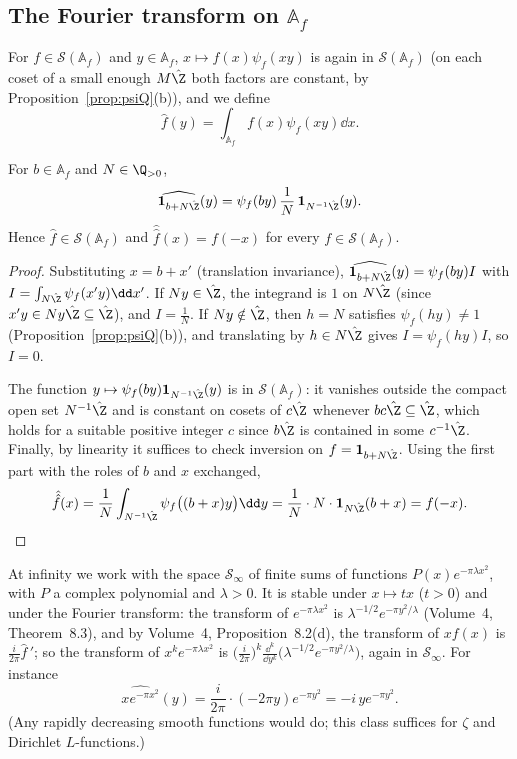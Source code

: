 \subsection*{The Fourier transform on \texorpdfstring{$\mathbb{A}_f$}{A\_f}}

For $f\in\mathcal S(\mathbb{A}_f)$ and $y\in\mathbb{A}_f$, $x\mapsto f(x)\psi_f(xy)$ is again in $\mathcal S(\mathbb{A}_f)$ (on each coset of a small enough $M\hat{\Z}$
both factors are constant, by Proposition~\ref{prop:psiQ}(b)), and we define
\[
\hat f(y)=\int_{\mathbb{A}_f}f(x)\psi_f(xy)\dd x.
\]

\begin{proposition}\label{prop:FTAf}
For $b\in\mathbb{A}_f$ and $N\in\Q_{>0}$,
\[
\widehat{\mathbf 1_{b+N\hat{\Z}}}(y)=\psi_f(by)\,\frac1N\,\mathbf 1_{N^{-1}\hat{\Z}}(y).
\]
Hence $\hat f\in\mathcal S(\mathbb{A}_f)$ and $\hat{\hat f}(x)=f(-x)$ for every $f\in\mathcal S(\mathbb{A}_f)$.
\end{proposition}
\begin{proof}
Substituting $x=b+x'$ (translation invariance), $\widehat{\mathbf 1_{b+N\hat{\Z}}}(y)=\psi_f(by)I$ with $I=\int_{N\hat{\Z}}\psi_f(x'y)\dd x'$. If
$Ny\in\hat{\Z}$, the integrand is $1$ on $N\hat{\Z}$ (since $x'y\in Ny\hat{\Z}\subseteq\hat{\Z}$), and $I=\frac1N$. If $Ny\notin\hat{\Z}$, then
$h=N$ satisfies $\psi_f(hy)\ne1$ (Proposition~\ref{prop:psiQ}(b)), and translating by $h\in N\hat{\Z}$ gives $I=\psi_f(hy)I$, so $I=0$.

The function $y\mapsto\psi_f(by)\mathbf 1_{N^{-1}\hat{\Z}}(y)$ is in $\mathcal S(\mathbb{A}_f)$: it vanishes outside the compact open set $N^{-1}\hat{\Z}$
and is constant on cosets of $c\hat{\Z}$ whenever $bc\hat{\Z}\subseteq\hat{\Z}$, which holds for a suitable positive integer $c$ since $b\hat{\Z}$ is
contained in some $c^{-1}\hat{\Z}$. Finally, by linearity it suffices to check inversion on $f=\mathbf 1_{b+N\hat{\Z}}$. Using the first part
with the roles of $b$ and $x$ exchanged,
\[
\hat{\hat f}(x)=\frac1N\int_{N^{-1}\hat{\Z}}\psi_f\bigl((b+x)y\bigr)\dd y=\frac1N\cdot N\cdot\mathbf 1_{N\hat{\Z}}(b+x)=f(-x).
\]
\end{proof}

At infinity we work with the space $\mathcal S_\infty$ of finite sums of functions $P(x)e^{-\pi\lambda x^2}$, with $P$ a complex polynomial
and $\lambda>0$. It is stable under $x\mapsto tx$ ($t>0$) and under the Fourier transform: the transform of $e^{-\pi\lambda x^2}$ is
$\lambda^{-1/2}e^{-\pi y^2/\lambda}$ (Volume~4, Theorem~8.3), and by Volume~4, Proposition~8.2(d), the transform of $xf(x)$ is $\frac i{2\pi}\hat f\,'$; so
the transform of $x^ke^{-\pi\lambda x^2}$ is $\bigl(\frac{i}{2\pi}\bigr)^k\frac{\dd^k}{\dd y^k}\bigl(\lambda^{-1/2}e^{-\pi y^2/\lambda}\bigr)$, again in
$\mathcal S_\infty$. For instance
\begin{equation}\label{eq:xgauss}
\widehat{xe^{-\pi x^2}}(y)=\frac{i}{2\pi}\cdot(-2\pi y)e^{-\pi y^2}=-i\,ye^{-\pi y^2}.
\end{equation}
(Any rapidly decreasing smooth functions would do; this class suffices for $\zeta$ and Dirichlet $L$-functions.)

